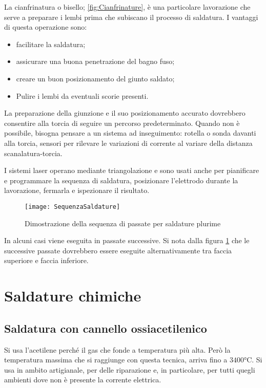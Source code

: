 La cianfrinatura o bisello; \ref{fig:Cianfrinature}, è una particolare lavorazione che serve a preparare i lembi prima che subiscano il processo di saldatura.
I vantaggi di questa operazione sono:
\begin{itemize}
\item facilitare la saldatura;
\item assicurare una buona penetrazione del bagno fuso;
\item creare un buon posizionamento del giunto saldato;
\item Pulire i lembi da eventuali scorie presenti.
\end{itemize}
La preparazione della giunzione e il suo posizionamento accurato dovrebbero consentire alla torcia di seguire un percorso predeterminato.
Quando non è possibile, bisogna pensare a un sistema ad inseguimento: rotella o sonda davanti alla torcia, sensori per rilevare le variazioni di corrente al variare della distanza scanalatura-torcia.

I sistemi laser operano mediante triangolazione e sono usati anche per pianificare e programmare la sequenza di saldatura, posizionare l'elettrodo durante la lavorazione, fermarla e ispezionare il risultato.

\begin{figure}
\centering
\texttt{[image: SequenzaSaldature]}
\caption{Dimostrazione della sequenza di passate per saldature plurime}
\label{fig:Sequenzasaldatura}
\end{figure}

In alcuni casi viene eseguita in passate successive.
Si nota dalla figura \ref{fig:Sequenzasaldatura} che le successive passate dovrebbero essere eseguite alternativamente tra faccia superiore e faccia inferiore.

\section{Saldature chimiche}
\subsection{Saldatura con cannello ossiacetilenico}
Si usa l'acetilene perché il gas che fonde a temperatura più alta.
Però la temperatura massima che si raggiunge con questa tecnica, arriva fino a $3400\unit{\celsius}$. Si usa in ambito artigianale, per delle riparazione e, in particolare, per tutti quegli ambienti dove non è presente la corrente elettrica.

